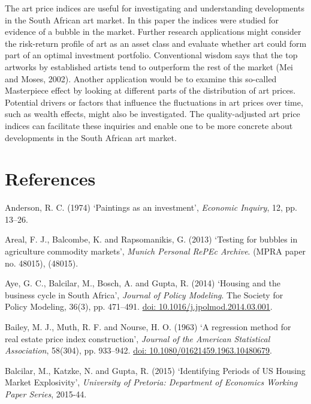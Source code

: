 \documentclass[12pt,]{article}
\begin{document}
The art price indices are useful for investigating and understanding
developments in the South African art market. In this paper the indices
were studied for evidence of a bubble in the market. Further research
applications might consider the risk-return profile of art as an asset
class and evaluate whether art could form part of an optimal investment
portfolio. Conventional wisdom says that the top artworks by established
artists tend to outperform the rest of the market (Mei and Moses, 2002).
Another application would be to examine this so-called Masterpiece
effect by looking at different parts of the distribution of art prices.
Potential drivers or factors that influence the fluctuations in art
prices over time, such as wealth effects, might also be investigated.
The quality-adjusted art price indices can facilitate these inquiries
and enable one to be more concrete about developments in the South
African art market.

\section*{References}\label{references}

Anderson, R. C. (1974) `Paintings as an investment', \emph{Economic
Inquiry}, 12, pp. 13--26.

Areal, F. J., Balcombe, K. and Rapsomanikis, G. (2013) `Testing for
bubbles in agriculture commodity markets', \emph{Munich Personal RePEc
Archive}. (MPRA paper no. 48015), (48015).

Aye, G. C., Balcilar, M., Bosch, A. and Gupta, R. (2014) `Housing and
the business cycle in South Africa', \emph{Journal of Policy Modeling}.
The Society for Policy Modeling, 36(3), pp. 471--491.
\href{http://doi.org/10.1016/j.jpolmod.2014.03.001}{doi: 10.1016/j.jpolmod.2014.03.001}.

Bailey, M. J., Muth, R. F. and Nourse, H. O. (1963) `A regression method
for real estate price index construction', \emph{Journal of the American
Statistical Association}, 58(304), pp. 933--942.
\href{http://doi.org/10.1080/01621459.1963.10480679}{doi: 10.1080/01621459.1963.10480679}.

Balcilar, M., Katzke, N. and Gupta, R. (2015) `Identifying Periods of US
Housing Market Explosivity', \emph{University of Pretoria: Department of
Economics Working Paper Series}, 2015-44.
\end{document}
